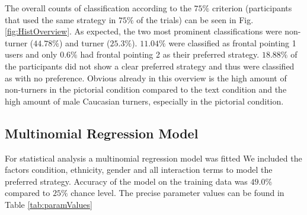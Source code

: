 \documentclass{frontiersSCNS} %
\begin{document}
The overall counts of classification according to the $75\%$ criterion (participants that used the same strategy in $75\%$ of the trials) can be seen in Fig. \ref{fig:HistOverview}. As expected, the two most prominent classifications were non-turner ($44.78\%$) and turner ($25.3\%$). $11.04\%$ were classified as frontal pointing 1 users and only $0.6\%$ had frontal pointing 2 as their preferred strategy. $18.88\%$ of the participants did not show a clear preferred strategy and thus were classified as with no preference.
Obvious already in this overview is the high amount of non-turners in the pictorial condition compared to the text condition and the high amount of male Caucasian turners, especially in the pictorial condition.




\subsection{Multinomial Regression Model}
For statistical analysis a multinomial regression model was fitted We included the factors condition, ethnicity, gender and all interaction terms to model the preferred strategy. Accuracy of the model on the training data was $49.0\%$ compared to $25\%$ chance level. The precise parameter values can be found in Table \ref{tab:paramValues}\\
\end{document}
